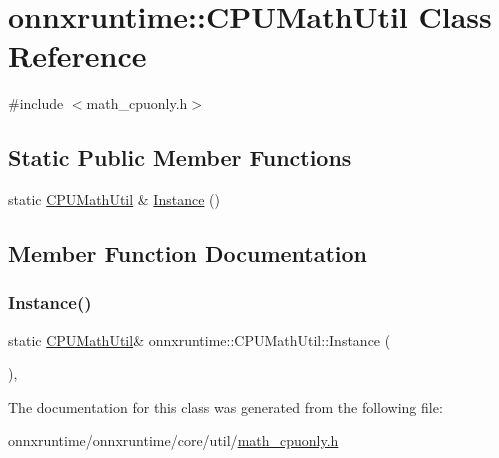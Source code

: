 \hypertarget{classonnxruntime_1_1CPUMathUtil}{}\section{onnxruntime\+:\+:C\+P\+U\+Math\+Util Class Reference}
\label{classonnxruntime_1_1CPUMathUtil}


{\ttfamily \#include $<$math\+\_\+cpuonly.\+h$>$}

\subsection*{Static Public Member Functions}
\begin{DoxyCompactItemize}
\item 
static \mbox{\hyperlink{classonnxruntime_1_1CPUMathUtil}{C\+P\+U\+Math\+Util}} \& \mbox{\hyperlink{classonnxruntime_1_1CPUMathUtil_a548a880a032da841911e09e621b3b785}{Instance}} ()
\end{DoxyCompactItemize}


\subsection{Member Function Documentation}
\mbox{\label{classonnxruntime_1_1CPUMathUtil_a548a880a032da841911e09e621b3b785}} 
\subsubsection{\texorpdfstring{Instance()}{Instance()}}
{\footnotesize\ttfamily static \mbox{\hyperlink{classonnxruntime_1_1CPUMathUtil}{C\+P\+U\+Math\+Util}}\& onnxruntime\+::\+C\+P\+U\+Math\+Util\+::\+Instance (\begin{DoxyParamCaption}{ }\end{DoxyParamCaption})\hspace{0.3cm}{\ttfamily [inline]}, {\ttfamily [static]}}



The documentation for this class was generated from the following file\+:\begin{DoxyCompactItemize}
\item 
onnxruntime/onnxruntime/core/util/\mbox{\hyperlink{math__cpuonly_8h}{math\+\_\+cpuonly.\+h}}\end{DoxyCompactItemize}

